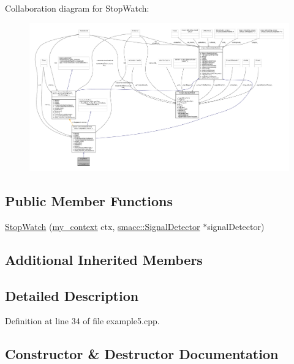 Collaboration diagram for Stop\+Watch\+:
\nopagebreak
\begin{figure}[H]
\begin{center}
\leavevmode
\includegraphics[width=350pt]{structStopWatch__coll__graph}
\end{center}
\end{figure}
\subsection*{Public Member Functions}
\begin{DoxyCompactItemize}
\item 
\hyperlink{structStopWatch_ac4723d2d422dbaf2f02026c2d3c4a0f7}{Stop\+Watch} (\hyperlink{common_8h_af2dcacead80d69b96952496fe413bbfe}{my\+\_\+context} ctx, \hyperlink{classsmacc_1_1SignalDetector}{smacc\+::\+Signal\+Detector} $\ast$signal\+Detector)
\end{DoxyCompactItemize}
\subsection*{Additional Inherited Members}


\subsection{Detailed Description}


Definition at line 34 of file example5.\+cpp.



\subsection{Constructor \& Destructor Documentation}
